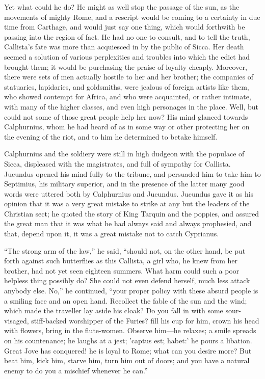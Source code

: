 Yet what could he do? He might as well stop the passage of the sun,
as the movements of mighty Rome, and a rescript would be coming to a
certainty in due time from Carthage, and would just say one
thing, which would forthwith be passing into the region of fact. He
had no one to consult, and to tell the truth, Callista's fate was more
than acquiesced in by the public of Sicca. Her death seemed a solution
of various perplexities and troubles into which the edict had brought
them; it would be purchasing the praise of loyalty cheaply. Moreover,
there were sets of men actually hostile to her and her brother; the
companies of statuaries, lapidaries, and goldsmiths, were jealous of
foreign artists like them, who showed contempt for Africa, and who
were acquainted, or rather intimate, with many of the higher classes,
and even high personages in the place. Well, but could not some of
those great people help her now? His mind glanced towards Calphurnius,
whom he had heard of as in some way or other protecting her on the
evening of the riot, and to him he determined to betake himself.

Calphurnius and the soldiery were still in high dudgeon with the
populace of Sicca, displeased with the magistrates, and full of
sympathy for Callista. Jucundus opened his mind fully to the tribune,
and persuaded him to take him to Septimius, his military superior, and
in the presence of the latter many good words were uttered both by
Calphurnius and Jucundus. Jucundus gave it as his opinion that it was
a very great mistake to strike at any but the leaders of the Christian
sect; he quoted the story of King Tarquin and the poppies, and assured
the great man that it was what he had always said and always
prophesied, and that, depend upon it, it was a great mistake not to
catch Cyprianus.

``The strong arm of the law,'' he said, ``should not,
on the other hand, be put forth against such butterflies as this
Callista, a girl who, he knew from her brother, had not yet seen
eighteen summers. What harm could such a poor helpless thing possibly
do? She could not even defend herself, much less attack anybody else.
No,'' he continued, ``your proper policy with these absurd
people is a smiling face and an open hand. Recollect the fable of the
sun and the wind; which made the traveller lay aside his cloak? Do you
fall in with some sour-visaged, stiff-backed worshipper of the Furies?
fill his cup for him, crown his head with flowers, bring in the
flute-women. Observe him—he relaxes; a smile spreads on his
countenance; he laughs at a jest; 'captus est; habet:' he pours a
libation. Great Jove has conquered! he is loyal to Rome; what can you
desire more? But beat him, kick him, starve him, turn him out of
doors; and you have a natural enemy to do you a mischief whenever he
can.''

